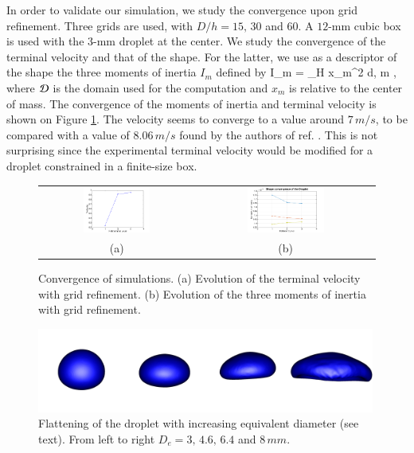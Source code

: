 In order to validate our simulation, we study the convergence upon grid 
refinement. Three grids are used, with $D/h=15,\,30$ and $60$. A $12$-mm 
cubic box is used with the $3$-mm droplet at the center.  
We study the convergence of the terminal velocity and that of the shape. 
For the latter, we use as a descriptor of the shape the three moments of 
inertia $I_m$ defined by
\be
I_m = \int_\DDD H x_m^2 {\rm d}\X \;,  \le m ,
\nd
where ${\cal D}$ is the domain used for the computation and $x_m$ is relative to
the center of mass. The convergence of the moments of inertia and terminal 
velocity is shown on Figure \ref{converge}. The velocity seems to converge 
to a value around $7\, m/s$, to be compared with a value of $8.06 \,m/s$ 
found by the authors of ref. \cite{gunn1949terminal}. 
This is not surprising since the experimental terminal velocity would be 
modified for a droplet constrained in a finite-size box.
\begin{figure}
\begin{center}
\begin{tabular}{cc}
\includegraphics[width=0.45\textwidth]{Figures/veloconv.png}
& \includegraphics[width=0.45\textwidth]{Figures/shapeconv.png} \\
(a) & (b)
\end{tabular}
\end{center}
\caption{Convergence of simulations. (a) Evolution of the terminal velocity 
with grid refinement. (b) Evolution of the three moments of inertia with 
grid refinement.}
\label{converge}
\end{figure}
\begin{figure}
\begin{center}
\includegraphics[width=0.99\textwidth]{Figures/flatten.png}
\end{center}
\caption{Flattening of the droplet with increasing equivalent diameter 
(see text). From left to right $D_e=3, \,4.6,\, 6.4$ and $8\, mm$.}
\label{flatten}
\end{figure}

